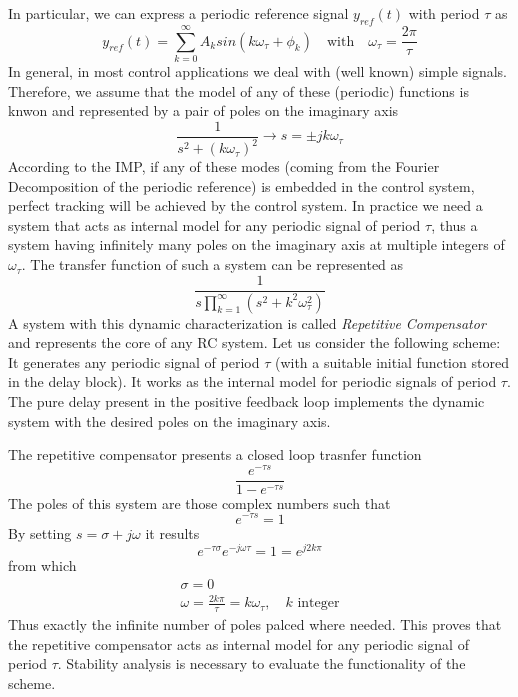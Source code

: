 \documentclass{book}
\begin{document}
In particular, we can express a periodic reference signal $y_{ref}(t)$ with period $\tau$ as 
\[
    y_{ref}(t) = \displaystyle\sum_{k=0}^{\infty}A_ksin(k\omega_\tau+\phi_k) \quad \text{with} \quad \omega_\tau=\displaystyle\frac{2\pi}{\tau}
\]
In general, in most control applications we deal with (well known) simple signals. Therefore, we assume that the model of any of these (periodic) functions is knwon and represented by a pair of poles on the imaginary axis 
\[
    \displaystyle\frac{1}{s^2+(k\omega_\tau)^2} \longrightarrow s = \pm jk\omega_\tau
\]
According to the IMP, if any of these modes (coming from the Fourier Decomposition of the periodic reference) is embedded in the control system, perfect tracking will be achieved by the control system. In practice we need a system that acts as internal model for any periodic signal of period $\tau$, thus a system having infinitely many poles on the imaginary axis at multiple integers of $\omega_\tau$.
The transfer function of such a system can be represented as 
\[
    \displaystyle\frac{1}{s\prod_{k=1}^\infty (s^2+k^2\omega_\tau^2)}
\]
A system with this dynamic characterization is called \emph{Repetitive Compensator} and represents the core of any RC system. Let us consider the following scheme: 
It generates any periodic signal of period $\tau$ (with a suitable initial function stored in the delay block). It works as the internal model for periodic signals of period $\tau$. The pure delay present in the positive feedback loop implements the dynamic system with the desired poles on the imaginary axis. 

The repetitive compensator presents a closed loop trasnfer function 
\[
    \displaystyle\frac{e^{-\tau s}}{1-e^{-\tau s}}
\]
The poles of this system are those complex numbers such that 
\[
    e^{-\tau s} = 1 
\]
By setting $s = \sigma+j\omega$ it results 
\[
    e^{-\tau\sigma} e ^{-j \omega \tau} = 1 = e^{j2k\pi}
\]
from which 
\begin{gather*}
    \sigma = 0 \\
    \omega = \displaystyle\frac{2k\pi}{\tau} = k \omega_\tau, \quad k \text{ integer}
\end{gather*}
Thus exactly the infinite number of poles palced where needed. This proves that the repetitive compensator acts as internal model for any periodic signal of period $\tau$. Stability analysis is necessary to evaluate the functionality of the scheme. 
\end{document}
